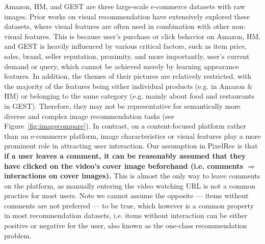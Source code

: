 \documentclass[sigconf]{acmart}
\begin{document}
Amazon, HM, and GEST are three large-scale e-commerce datasets with raw images. Prior works on visual recommendation \cite{he2016vbpr,he2016ups,du2020learn} have extensively explored these datasets, where visual features are often used in combination with other non-visual features. This is because  user's purchase or click behavior on Amazon, HM,  and GEST is heavily  influenced by various critical factors, such as item price,  sales, brand, seller reputation, proximity, and more importantly, user's current demand  or query, which cannot be achieved merely  by learning appearance features.  
In addition, the themes of their pictures are relatively restricted,  with the majority of the features being either individual  products (e.g. in Amazon \&  HM) or  belonging to the same category (e.g. mainly about food and restaurants in GEST).
 Therefore, they may not be representative  for semantically  more diverse and complex image recommendation tasks (see Figure~\ref{fig:imagecompare}).
In contrast, on a content-focused platform rather than an e-commerce platform,  image characteristics or visual features play a more prominent role in attracting user interaction.
Our assumption in PixelRec is that \textbf{if a user leaves a comment, it can be reasonably assumed that they have clicked on the video's cover image beforehand (i.e. comments $\Rightarrow$  interactions on cover images). } This is almost the only way to leave comments on the  platform, as manually entering the video watching URL is not a common practice for most users. Note we cannot assume the opposite --- items without comments are not preferred ---  to be true, which however is a common property in most recommendation datasets, i.e. items without interaction can be either positive or negative for the user, also known as the one-class recommendation problem.
\end{document}
